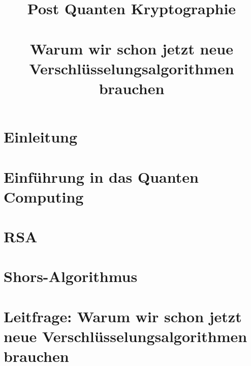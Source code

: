 \documentclass[conference]{IEEEtran}
\begin{document}

\title{Post Quanten Kryptographie\\
\large \ \\ \large Warum wir schon jetzt neue Verschlüsselungsalgorithmen brauchen}

\author{

  \and

}

\maketitle



\listoffigures
{}


\section{Einleitung}


\section{Einführung in das Quanten Computing}


\section{RSA}


\section{Shors-Algorithmus}


\section{Leitfrage: Warum wir schon jetzt neue Verschlüsselungsalgorithmen brauchen}

\end{document}

